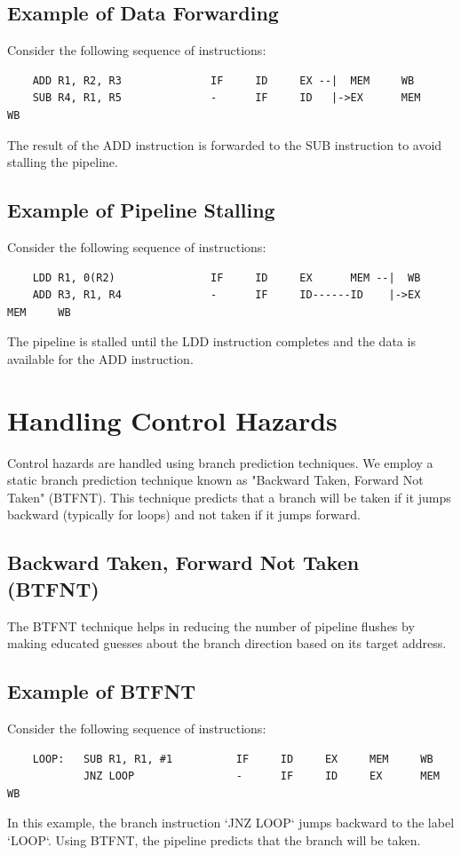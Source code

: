 \documentclass{report}
\begin{document}
\subsection*{Example of Data Forwarding}
Consider the following sequence of instructions:
\begin{verbatim}
    ADD R1, R2, R3              IF     ID     EX --|  MEM     WB
    SUB R4, R1, R5              -      IF     ID   |->EX      MEM     WB
\end{verbatim}
The result of the ADD instruction is forwarded to the SUB instruction to avoid stalling the pipeline.

\subsection*{Example of Pipeline Stalling}
Consider the following sequence of instructions:
\begin{verbatim}
    LDD R1, 0(R2)               IF     ID     EX      MEM --|  WB
    ADD R3, R1, R4              -      IF     ID------ID    |->EX      MEM     WB 
\end{verbatim}
The pipeline is stalled until the LDD instruction completes and the data is available for the ADD instruction.

\section*{Handling Control Hazards}
Control hazards are handled using branch prediction techniques. We employ a static branch prediction technique known as "Backward Taken, Forward Not Taken" (BTFNT). This technique predicts that a branch will be taken if it jumps backward (typically for loops) and not taken if it jumps forward.

\subsection*{Backward Taken, Forward Not Taken (BTFNT)}
The BTFNT technique helps in reducing the number of pipeline flushes by making educated guesses about the branch direction based on its target address.

\subsection*{Example of BTFNT}
Consider the following sequence of instructions:
\begin{verbatim}
    LOOP:   SUB R1, R1, #1          IF     ID     EX     MEM     WB
            JNZ LOOP                -      IF     ID     EX      MEM     WB
\end{verbatim}
In this example, the branch instruction `JNZ LOOP` jumps backward to the label `LOOP`. Using BTFNT, the pipeline predicts that the branch will be taken.
\end{document}
